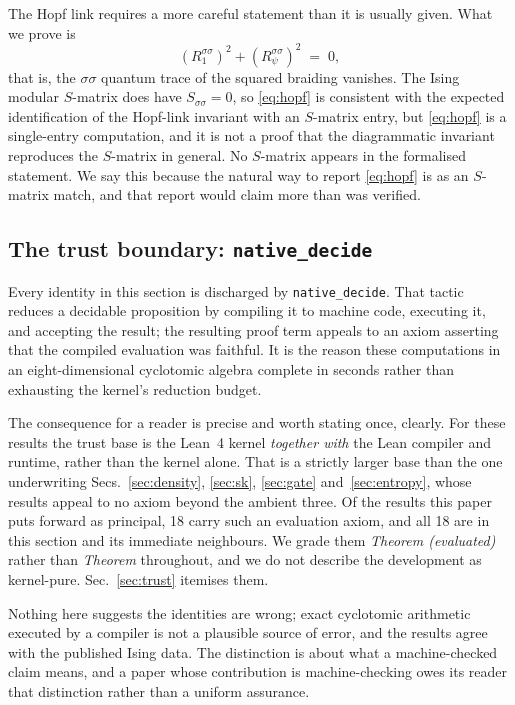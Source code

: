 \documentclass[aps,prx,nofootinbib,superscriptaddress,12pt]{revtex4-2}
\begin{document}
The Hopf link requires a more careful statement than it is usually given.
What we prove is
\begin{equation}
(R^{\sigma\sigma}_1)^2 + (R^{\sigma\sigma}_\psi)^2 \;=\; 0 ,
\label{eq:hopf}
\end{equation}
that is, the $\sigma\sigma$ quantum trace of the squared braiding
vanishes. The Ising modular $S$-matrix does have $S_{\sigma\sigma} = 0$,
so \eqref{eq:hopf} is consistent with the expected identification of the
Hopf-link invariant with an $S$-matrix entry, but \eqref{eq:hopf} is a
single-entry computation, and it is not a proof that the diagrammatic
invariant reproduces the $S$-matrix in general. No $S$-matrix appears in
the formalised statement. We say this because the natural way to report
\eqref{eq:hopf} is as an $S$-matrix match, and that report would claim
more than was verified.

\subsection{The trust boundary: \texttt{native\_decide}}
\label{subsec:nd}

Every identity in this section is discharged by \texttt{native\_decide}.
That tactic reduces a decidable proposition by compiling it to machine
code, executing it, and accepting the result; the resulting proof term
appeals to an axiom asserting that the compiled evaluation was faithful.
It is the reason these computations in an eight-dimensional cyclotomic
algebra complete in seconds rather than exhausting the kernel's reduction
budget.

The consequence for a reader is precise and worth stating once, clearly.
For these results the trust base is the Lean~4 kernel \emph{together
with} the Lean compiler and runtime, rather than the kernel alone. That
is a strictly larger base than the one underwriting
Secs.~\ref{sec:density}, \ref{sec:sk}, \ref{sec:gate}
and~\ref{sec:entropy}, whose results appeal to no axiom beyond the
ambient three. Of the results this paper puts forward as principal, 18
carry such an evaluation axiom, and all 18 are in this section and its
immediate neighbours. We grade them \emph{Theorem (evaluated)} rather
than \emph{Theorem} throughout, and we do not describe the development as
kernel-pure. Sec.~\ref{sec:trust} itemises them.

Nothing here suggests the identities are wrong; exact cyclotomic
arithmetic executed by a compiler is not a plausible source of error, and
the results agree with the published Ising data. The distinction is about
what a machine-checked claim means, and a paper whose contribution is
machine-checking owes its reader that distinction rather than a uniform
assurance.
\end{document}
